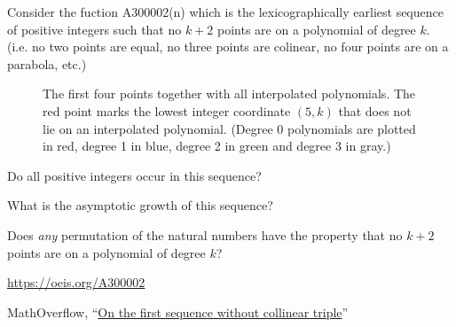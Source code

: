 \documentclass{article}
\begin{document}
Consider the fuction A300002(n) which is the lexicographically earliest
sequence of positive integers such that no $k + 2$ points are on a polynomial
of degree $k$. (i.e. no two points are equal, no three points are colinear, no
four points are on a parabola, etc.)
\begin{figure}[!h]
  \centering
  \caption{
    The first four points together with all interpolated polynomials.
    The red point marks the lowest integer coordinate $(5, k)$ that does not
    lie on an interpolated polynomial. (Degree 0 polynomials are plotted in red,
    degree 1 in blue, degree 2 in green and degree 3 in gray.)
  }
\end{figure}

\begin{question}
  Do all positive integers occur in this sequence?
\end{question}

\begin{related}
  \item What is the asymptotic growth of this sequence?
  \item Does \textit{any} permutation of the natural numbers have the property
  that no $k + 2$ points are on a polynomial of degree $k$?
\end{related}

\begin{references}
  \item \url{https://oeis.org/A300002}
  \item MathOverflow, ``\href{https://mathoverflow.net/q/338528/104733}{On the first sequence without collinear triple}''
\end{references}
\end{document}
